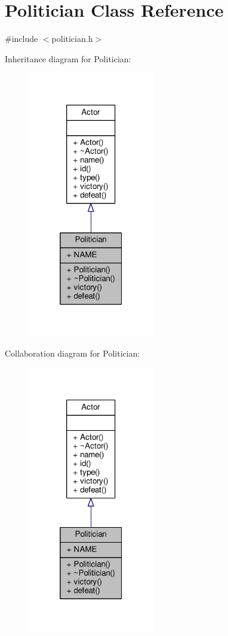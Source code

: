 \hypertarget{classPolitician}{}\section{Politician Class Reference}
\label{classPolitician}


{\ttfamily \#include $<$politician.\+h$>$}



Inheritance diagram for Politician\+:
\nopagebreak
\begin{figure}[H]
\begin{center}
\leavevmode
\includegraphics[width=157pt]{classPolitician__inherit__graph}
\end{center}
\end{figure}


Collaboration diagram for Politician\+:
\nopagebreak
\begin{figure}[H]
\begin{center}
\leavevmode
\includegraphics[width=157pt]{classPolitician__coll__graph}
\end{center}
\end{figure}
